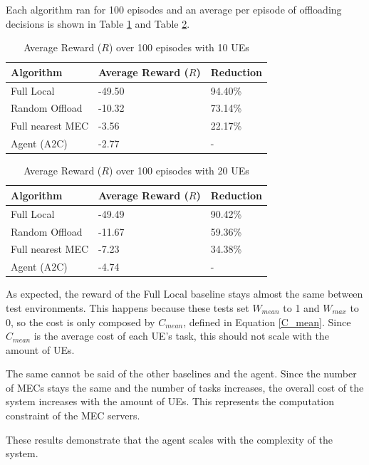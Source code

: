 \hfill \break
Each algorithm ran for 100 episodes and an average per episode of offloading decisions is shown in Table \ref{results_5_10} and Table \ref{results_5_20}.

\begin{table}[H]
\centering
\begin{tabular}{|l|l|l|}
\hline
Algorithm        & Average Reward ($R$) & Reduction\\ \hline
Full Local       & -49.50 & 94.40\%\\
Random Offload   & -10.32 & 73.14\%\\
Full nearest MEC & -3.56 & 22.17\%\\ 
Agent (A2C) & -2.77 & -\\ \hline
\end{tabular}
\caption{Average Reward ($R$) over 100 episodes with 10 \acrshort{UE}s} \label{results_5_10}
\end{table}

\begin{table}[H]
\centering
\begin{tabular}{|l|l|l|}
\hline
Algorithm        & Average Reward ($R$) & Reduction\\ \hline
Full Local       & -49.49 & 90.42\%\\
Random Offload   & -11.67 & 59.36\%\\
Full nearest MEC & -7.23 & 34.38\%\\ 
Agent (A2C) & -4.74 & -\\ \hline
\end{tabular}
\caption{Average Reward ($R$) over 100 episodes with 20 \acrshort{UE}s} \label{results_5_20}
\end{table}

As expected, the reward of the Full Local baseline stays almost the same between test environments. This happens because these tests set $W_{mean}$ to 1 and $W_{max}$ to 0, so the cost is only composed by $C_{mean}$, defined in Equation \ref{C_mean}. Since $C_{mean}$ is the average cost of each \acrshort{UE}'s task, this should not scale with the amount of \acrshort{UE}s.

The same cannot be said of the other baselines and the agent. Since the number of \acrshort{MEC}s stays the same and the number of tasks increases, the overall cost of the system increases with the amount of \acrshort{UE}s. This represents the computation constraint of the \acrshort{MEC} servers. 

These results demonstrate that the agent scales with the complexity of the system.

